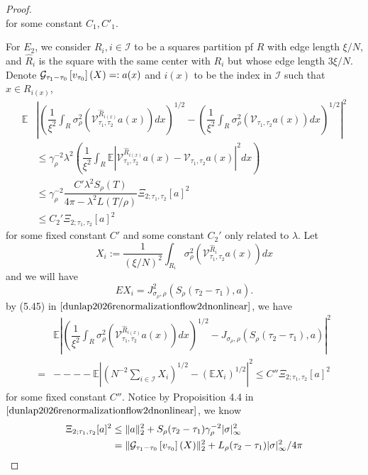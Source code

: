 \begin{proof}
\[    \]
    for some constant $C_1,C'_1$.\par
    For $E_2$, we consider $R_i, i\in\mathcal{I}$ to be a squares partition pf $R$ with edge length $\xi/N$, and $\hat{R}_i$  is the square with the same center with $R_i$ but whose edge length $3\xi/N$. Denote $\mathcal{G}_{\tau_1-\tau_0}\left[{v_{\tau_0}}\right](X) =: a(x)$ and $i(x)$ to be the index in $\mathcal{I}$ such that $x\in R_{i(x)}$,
    \[
    \begin{aligned}
    \mathbb{E}&\left|\left(\dfrac{1}{\xi^2}\int_R \sigma_{\rho}^2(\mathcal{V}_{\tau_1,\tau_2}^{\hat{R}_{i(x)}}a(x))dx\right)^{1/2} - \left(\dfrac{1}{\xi^2}\int_R \sigma_{\rho}^2(\mathcal{V}_{\tau_1,\tau_2}a(x))dx\right)^{1/2}\right|^2 \\
    &\leq
    \gamma_{\rho}^{-2}\lambda^2\left(\dfrac{1}{\xi^2}\int_R \mathbb{E}\left|\mathcal{V}_{\tau_1,\tau_2}^{\hat{R}_{i(x)}}a(x) - \mathcal{V}_{\tau_1,\tau_2}a(x)\right|^2dx\right) \\
    &\leq \gamma_{\rho}^{-2}\dfrac{C'\lambda^2 S_{\rho}{(T)}}{4\pi-\lambda^2L(T/\rho)} \Xi_{2;\tau_1,\tau_2}[a]^2 \\
    &\leq
    C_2'\Xi_{2;\tau_1,\tau_2}[a]^2  
    \end{aligned}
    \]
    for some fixed constant $C'$ and some constant $C_2'$ only related to $\lambda$. Let
    \[X_i := \dfrac{1}{(\xi/N)^2}\int_{R_i}\sigma_{\rho}^2(\mathcal{V}_{\tau_1,\tau_2}^{\hat{R}_{i}}a(x))dx\]
    and we will have
    \[
    EX_i = J^2_{\sigma_{\rho},\rho}(S_{\rho}(\tau_2-\tau_1),a).
    \]
    by (5.45) in $\cite{dunlap2026renormalizationflow2dnonlinear}$, we have
    \[
    \begin{aligned}
        &\mathbb{E}\left|
    \left(\dfrac{1}{\xi^2}\int_R \sigma_{\rho}^2(\mathcal{V}_{\tau_1,\tau_2}^{\hat{R}_{i(x)}}a(x))dx\right)^{1/2} - 
    J_{\sigma_{\rho},\rho}(S_{\rho}(\tau_2-\tau_1),a)
    \right|^2 \\
    = & ----\mathbb{E}\left|\left(N^{-2}\sum\limits_{i\in\mathcal{I}}X_i\right)^{1/2} - (\mathbb{E}X_i)^{1/2}\right|^2 \leq C''\Xi_{2;\tau_1,\tau_2}[a]^2
    \end{aligned}
    \]
    for some fixed constant $C''$. Notice by Propoisition 4.4 in $\cite{dunlap2026renormalizationflow2dnonlinear}$, we know
    \[
    \begin{aligned}
        \Xi_{2;\tau_1,\tau_2}[a]^2 &\leq \lVert a\rVert_2^2 + S_{\rho}(\tau_2-\tau_1)\gamma_{\rho}^{-2}|\sigma|_{\infty}^2 \\
        &= \lVert \hsemig{\tau_1-\tau_0}{v_{\tau_0}}(X)\rVert_2^2 + L_{\rho}(\tau_2-\tau_1)|\sigma|_{\infty}^2/4\pi \\

\end{aligned}\]
\end{proof}
